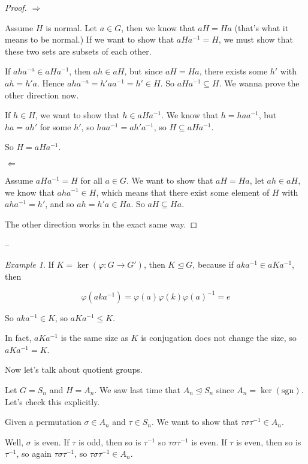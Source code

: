 \documentclass[12pt]{article}
\def\sgn{\text{sgn}}
\def\phi{\varphi}
\def\sgn{\text{sgn}}
\theoremstyle{remark}
\theoremstyle{remark}
\theoremstyle{remark}
\newtheorem{example}{Example}
\theoremstyle{remark}
\theoremstyle{remark}
\begin{document}
\begin{proof}
  $\Rightarrow$

  Assume $H$ is normal. Let $a \in G$, then we know that $aH = Ha$ (that's what it
  means to be normal.) If we want to show that $aHa^{-1} = H$, we must show that
  these two sets are subsets of each other.

  If $aha^{-a} \in aHa^{-1}$, then $ah \in aH$, but since $aH = Ha$, there exists
  some $h'$ with $ah = h'a$. Hence $aha^{-a} = h'aa^{-1} = h' \in H$. So $aHa^{-1}
  \subseteq H$. We wanna prove the other direction now.

  If $h \in H$, we want to show that $h \in aHa^{-1}$. We know that $h =
  haa^{-1}$, but $ha = ah'$ for some $h'$, so $haa^{-1} = ah'a^{-1}$, so $H
  \subseteq aHa^{-1}$.

  So $H = aHa^{-1}$.

  $\Leftarrow$

  Assume $aHa^{-1} = H$ for all $a \in G$. We want to show that $aH = Ha$, let $ah
  \in aH$, we know that $aha^{-1} \in H$, which means that there exist some
  element of $H$ with $aha^{-1} = h'$, and so $ah = h'a \in Ha$. So $aH \subseteq
  Ha$.

  The other direction works in the exact same way.
\end{proof}

--

\begin{example}
  If $K = \ker(\phi: G \to G')$, then $K \trianglelefteq G$, because if
  $aka^{-1} \in aKa^{-1}$, then

  \[
    \phi(aka^{-1}) = \phi(a) \phi(k) \phi(a)^{-1} = e
  \]

  So $aka^{-1} \in K$, so $aKa^{-1} \le K$.

  In fact, $aKa^{-1}$ is the same size as $K$ is conjugation does not change the
  size, so $aKa^{-1} = K$.
\end{example}

Now let's talk about quotient groups.

Let $G = S_n$ and $H = A_n$. We saw last time that $A_n \trianglelefteq S_n$
since $A_n = \ker(\sgn)$. Let's check this explicitly.

Given a permutation $\sigma \in A_n$ and $\tau \in S_n$. We want to show that
$\tau \sigma \tau^{-1} \in A_n$.

Well, $\sigma$ is even. If $\tau$ is odd, then so is $\tau^{-1}$ so $\tau
\sigma \tau^{-1}$ is even. If $\tau$ is even, then so is $\tau^{-1}$, so again
$\tau \sigma \tau^{-1}$, so $\tau \sigma \tau^{-1} \in A_n$.
\end{document}
